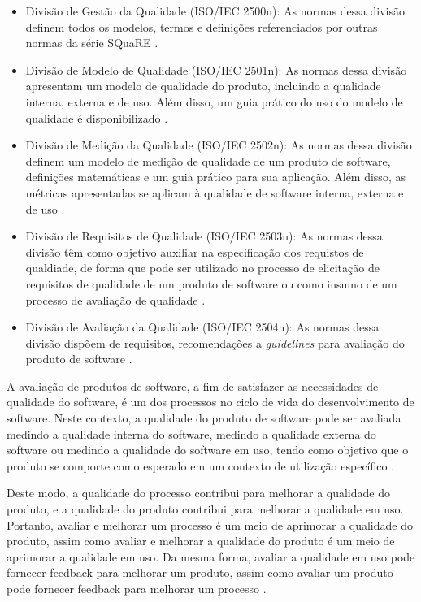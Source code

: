 \begin{itemize}
  \item Divisão de Gestão da Qualidade (ISO/IEC 2500n): As normas dessa divisão definem todos os modelos, termos e definições referenciados por outras normas da série SQuaRE .
  \item Divisão de Modelo de Qualidade (ISO/IEC 2501n): As normas dessa divisão apresentam um modelo de qualidade do produto, incluindo a qualidade interna, externa e de uso. Além disso, um guia prático do uso do modelo de qualidade é disponibilizado .
  \item Divisão de Medição da Qualidade (ISO/IEC 2502n): As normas dessa divisão definem um modelo de medição de qualidade de um produto de software, definições matemáticas e um guia prático para sua aplicação. Além disso, as métricas apresentadas se aplicam à qualidade de software interna, externa e de uso .
  \item Divisão de Requisitos de Qualidade (ISO/IEC 2503n): As normas dessa divisão têm como objetivo auxiliar na especificação dos requistos de qualdiade, de forma que pode ser utilizado no processo de elicitação de requisitos de qualidade de um produto de software ou como insumo de um processo de avaliação de qualidade .
  \item Divisão de Avaliação da Qualidade (ISO/IEC 2504n): As normas dessa divisão dispõem de requisitos, recomendações a \textit{guidelines} para avaliação do produto de software .
\end{itemize}

A avaliação de produtos de software, a fim de satisfazer as necessidades de qualidade do software, é um dos processos no ciclo de vida do desenvolvimento de software. Neste contexto, a qualidade do produto de software pode ser avaliada medindo a qualidade interna do software, medindo a qualidade externa do software ou medindo a qualidade do software em uso, tendo como objetivo que o produto se comporte como esperado em um contexto de utilização específico . 

Deste modo, a qualidade do processo contribui para melhorar a qualidade do produto, e a qualidade do produto contribui para melhorar a qualidade em uso. Portanto, avaliar e melhorar um processo é um meio de aprimorar a qualidade do produto, assim como avaliar e melhorar a qualidade do produto é um meio de aprimorar a qualidade em uso. Da mesma forma, avaliar a qualidade em uso pode fornecer feedback para melhorar um produto, assim como avaliar um produto pode fornecer feedback para melhorar um processo .

